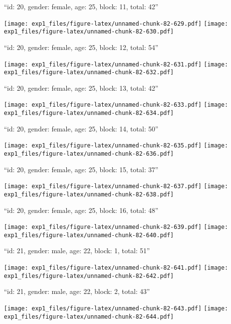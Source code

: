 \documentclass[11pt,,]{article}
\begin{document}
\newpage
[1] 

``id: 20, gender: female, age: 25, block: 11, total: 42''

\texttt{[image: exp1\_files/figure-latex/unnamed-chunk-82-629.pdf]}
\texttt{[image: exp1\_files/figure-latex/unnamed-chunk-82-630.pdf]}

\newpage
[1] 

``id: 20, gender: female, age: 25, block: 12, total: 54''

\texttt{[image: exp1\_files/figure-latex/unnamed-chunk-82-631.pdf]}
\texttt{[image: exp1\_files/figure-latex/unnamed-chunk-82-632.pdf]}

\newpage
[1] 

``id: 20, gender: female, age: 25, block: 13, total: 42''

\texttt{[image: exp1\_files/figure-latex/unnamed-chunk-82-633.pdf]}
\texttt{[image: exp1\_files/figure-latex/unnamed-chunk-82-634.pdf]}

\newpage
[1] 

``id: 20, gender: female, age: 25, block: 14, total: 50''

\texttt{[image: exp1\_files/figure-latex/unnamed-chunk-82-635.pdf]}
\texttt{[image: exp1\_files/figure-latex/unnamed-chunk-82-636.pdf]}

\newpage
[1] 

``id: 20, gender: female, age: 25, block: 15, total: 37''

\texttt{[image: exp1\_files/figure-latex/unnamed-chunk-82-637.pdf]}
\texttt{[image: exp1\_files/figure-latex/unnamed-chunk-82-638.pdf]}

\newpage
[1] 

``id: 20, gender: female, age: 25, block: 16, total: 48''

\texttt{[image: exp1\_files/figure-latex/unnamed-chunk-82-639.pdf]}
\texttt{[image: exp1\_files/figure-latex/unnamed-chunk-82-640.pdf]}

\newpage
[1] 

``id: 21, gender: male, age: 22, block: 1, total: 51''

\texttt{[image: exp1\_files/figure-latex/unnamed-chunk-82-641.pdf]}
\texttt{[image: exp1\_files/figure-latex/unnamed-chunk-82-642.pdf]}

\newpage
[1] 

``id: 21, gender: male, age: 22, block: 2, total: 43''

\texttt{[image: exp1\_files/figure-latex/unnamed-chunk-82-643.pdf]}
\texttt{[image: exp1\_files/figure-latex/unnamed-chunk-82-644.pdf]}
\end{document}
